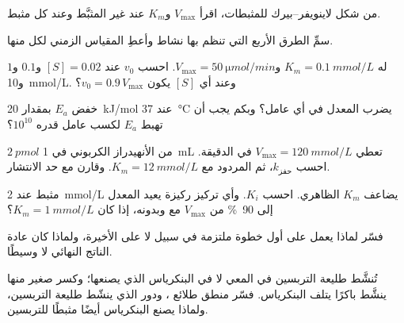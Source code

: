 \begin{exercise}[$\star$]\label{exo:b1:enzymes:3}
من شكل لاينويفر--بيرك للمثبطات، اقرأ $V_{\max}$ و$K_m$ عند 
غير المثبَّط وعند كل مثبط.
\end{exercise}

\begin{exercise}[$\star$]\label{exo:b1:enzymes:4}
سمِّ الطرق الأربع التي تنظم بها  نشاط  وأعطِ المقياس
الزمني لكل منها.
\end{exercise}

\begin{exercise}[$\star\star$]\label{exo:b1:enzymes:5}
 له $K_m = \qty{0.1}{mmol/L}$ و$V_{\max} =
\qty{50}{\micro mol/min}$.
احسب $v_0$ عند $[S] = 0.02$ و$0.1$ و$1$ و\qty{10}{mmol/L}. وعند أي
$[S]$ يكون $v_0 = 0.9\,V_{\max}$؟
\end{exercise}

\begin{exercise}[$\star\star$]\label{exo:b1:enzymes:6}
خفض $E_a$ بمقدار \qty{20}{kJ/mol} عند \qty{37}{\celsius} يضرب المعدل
في أي عامل؟ وبكم يجب أن تهبط $E_a$ لكسب عامل قدره $10^{10}$؟
\end{exercise}

\begin{exercise}[$\star\star$]\label{exo:b1:enzymes:7}
$\qty{2}{pmol}$ من الأنهيدراز الكربوني في \qty{1}{mL} تعطي
$V_{\max} = \qty{120}{mmol/L}$ في الدقيقة. احسب $k_{\text{حفز}}$،
ثم المردود مع $K_m = \qty{12}{mmol/L}$. وقارن مع حد الانتشار.
\end{exercise}

\begin{exercise}[$\star\star$]\label{exo:b1:enzymes:8}
مثبط  عند \qty{2}{mmol/L} يضاعف $K_m$ الظاهري. احسب $K_i$. وأي
تركيز ركيزة يعيد المعدل إلى \qty{90}{\%} من $V_{\max}$ مع 
وبدونه، إذا كان $K_m = \qty{1}{mmol/L}$؟
\end{exercise}

\begin{exercise}[$\star\star$]\label{exo:b1:enzymes:9}
فسّر لماذا يعمل  على أول خطوة ملتزمة في سبيل لا على
الأخيرة، ولماذا كان  عادة الناتج النهائي لا وسيطًا.
\end{exercise}

\begin{exercise}[$\star\star\star$]\label{exo:b1:enzymes:10}
تُنشَّط طليعة التربسين في المعي لا في البنكرياس الذي يصنعها؛ وكسر
صغير منها ينشَّط باكرًا يتلف البنكرياس. فسّر منطق طلائع ،
ودور  الذي ينشّط طليعة التربسين، ولماذا يصنع البنكرياس أيضًا
مثبطًا للتربسين.
\end{exercise}

